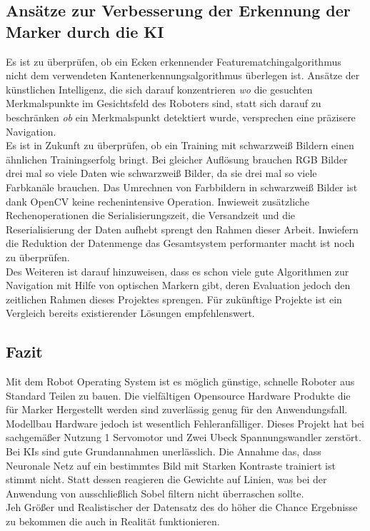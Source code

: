 \documentclass[conference]{IEEEtran}
\begin{document}
	\subsection{Ansätze zur Verbesserung der Erkennung der Marker durch die KI}
	
	Es ist zu überprüfen, ob ein Ecken erkennender Featurematchingalgorithmus nicht dem verwendeten Kantenerkennungsalgorithmus überlegen ist. Ansätze der künstlichen Intelligenz, die sich darauf konzentrieren \textit{wo} die gesuchten Merkmalspunkte im Gesichtsfeld des Roboters sind, statt sich darauf zu beschränken \textit{ob} ein Merkmalspunkt detektiert wurde, versprechen eine präzisere Navigation. \\
	Es ist in Zukunft zu überprüfen, ob ein Training mit schwarzweiß Bildern einen ähnlichen Trainingserfolg bringt. Bei gleicher Auflösung brauchen RGB Bilder drei mal so viele Daten wie schwarzweiß Bilder, da sie drei mal so viele Farbkanäle brauchen. Das Umrechnen von Farbbildern in schwarzweiß Bilder ist dank OpenCV keine rechenintensive Operation. Inwieweit zusätzliche Rechenoperationen die Serialisierungszeit, die Versandzeit und die Reserialisierung der Daten aufhebt sprengt den Rahmen dieser Arbeit. Inwiefern die Reduktion der Datenmenge das Gesamtsystem performanter macht ist noch zu überprüfen.
	\\
	Des Weiteren ist darauf hinzuweisen, dass es schon viele gute Algorithmen zur Navigation mit Hilfe von optischen Markern gibt, deren Evaluation jedoch den zeitlichen Rahmen dieses Projektes sprengen. Für zukünftige Projekte ist ein Vergleich bereits existierender Lösungen empfehlenswert.
		
	\subsection{Fazit}

Mit dem Robot Operating System ist es möglich günstige, schnelle Roboter 
aus Standard Teilen zu bauen. Die vielfältigen Opensource Hardware 
Produkte die für Marker Hergestellt werden sind zuverlässig genug für den 
Anwendungsfall. Modellbau Hardware jedoch ist wesentlich Fehleranfälliger. 
Dieses Projekt hat bei sachgemäßer Nutzung 1 Servomotor und Zwei Ubeck 
Spannungswandler zerstört.\\

Bei KIs sind gute Grundannahmen unerlässlich. Die Annahme das, dass 
Neuronale Netz auf ein bestimmtes Bild mit  Starken Kontraste trainiert ist 
stimmt nicht. Statt dessen reagieren die Gewichte auf Linien, was bei der 
Anwendung von ausschließlich Sobel filtern nicht überraschen sollte.
\\
Jeh Größer und Realistischer der Datensatz des do höher die Chance 
Ergebnisse zu bekommen die auch in Realität funktionieren.   \\
\end{document}
